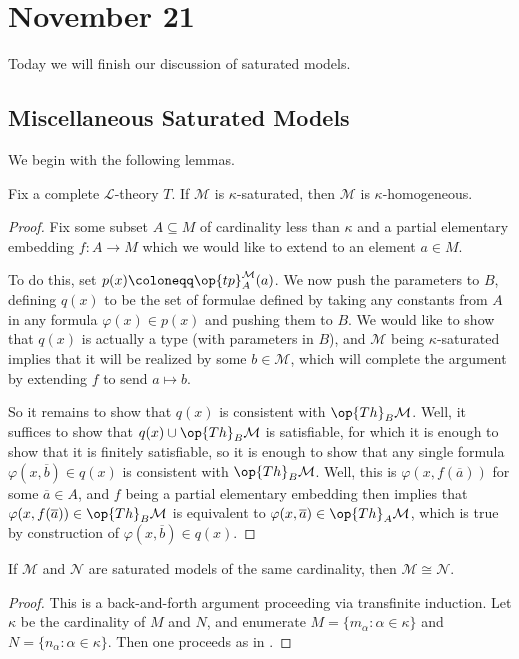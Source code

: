 \documentclass[../notes.tex]{subfiles}
\begin{document}
\section{November 21}

Today we will finish our discussion of saturated models.

\subsection{Miscellaneous Saturated Models}
We begin with the following lemmas.
\begin{lemma}
	Fix a complete $\mathcal L$-theory $T$. If $\mathcal M$ is $\kappa$-saturated, then $\mathcal M$ is $\kappa$-homogeneous.
\end{lemma}
\begin{proof}
	Fix some subset $A\subseteq M$ of cardinality less than $\kappa$ and a partial elementary embedding $f\colon A\to M$ which we would like to extend to an element $a\in M$.

	To do this, set $p(x)\coloneqq\op{tp}^\mathcal M_A(a)$. We now push the parameters to $B$, defining $q(x)$ to be the set of formulae defined by taking any constants from $A$ in any formula $\varphi(x)\in p(x)$ and pushing them to $B$. We would like to show that $q(x)$ is actually a type (with parameters in $B$), and $\mathcal M$ being $\kappa$-saturated implies that it will be realized by some $b\in\mathcal M$, which will complete the argument by extending $f$ to send $a\mapsto b$.

	So it remains to show that $q(x)$ is consistent with $\op{Th}_B\mathcal M$. Well, it suffices to show that $q(x)\cup\op{Th}_B\mathcal M$ is satisfiable, for which it is enough to show that it is finitely satisfiable, so it is enough to show that any single formula $\varphi(x,\overline b)\in q(x)$ is consistent with $\op{Th}_B\mathcal M$. Well, this is $\varphi(x,f(\overline a))$ for some $\overline a\in A$, and $f$ being a partial elementary embedding then implies that $\varphi(x,f(\overline a))\in\op{Th}_B\mathcal M$ is equivalent to $\varphi(x,\overline a)\in\op{Th}_A\mathcal M$, which is true by construction of $\varphi(x,\overline b)\in q(x)$.
\end{proof}
\begin{lemma} \label{lem:saturated-is-uniq}
	If $\mathcal M$ and $\mathcal N$ are saturated models of the same cardinality, then $\mathcal M\cong\mathcal N$.
\end{lemma}
\begin{proof}
	This is a back-and-forth argument proceeding via transfinite induction. Let $\kappa$ be the cardinality of $M$ and $N$, and enumerate $M=\{m_\alpha:\alpha\in\kappa\}$ and $N=\{n_\alpha:\alpha\in\kappa\}$. Then one proceeds as in .
\end{proof}
\end{document}
